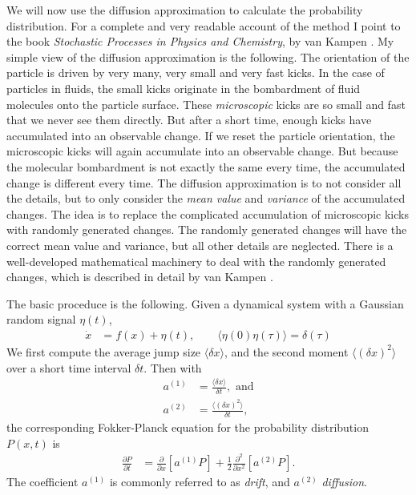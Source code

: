\documentclass[thesis.tex]{subfiles}
\begin{document}
We will now use the diffusion approximation to calculate the probability distribution. For a complete and very readable account of the method I point to the book \emph{Stochastic Processes in Physics and Chemistry}, by van Kampen \cite{kampen2007}. My simple view of the diffusion approximation is the following. The orientation of the particle is driven by very many, very small and very fast kicks. In the case of particles in fluids, the small kicks originate in the bombardment of fluid molecules onto the particle surface. These \emph{microscopic} kicks are so small and fast that we never see them directly. But after a short time, enough kicks have accumulated into an observable change. If we reset the particle orientation, the microscopic kicks will again accumulate into an observable change. But because the molecular bombardment is not exactly the same every time, the accumulated change is different every time. The diffusion approximation is to not consider all the details, but to only consider the \emph{mean value} and \emph{variance} of the accumulated changes. The idea is to replace the complicated accumulation of microscopic kicks with randomly generated changes. The randomly generated changes will have the correct mean value and variance, but all other details are neglected. There is a well-developed mathematical machinery to deal with the randomly generated changes, which is described in detail by van Kampen \cite{kampen2007}.

The basic proceduce is the following. Given a dynamical system with a Gaussian random signal $\eta(t)$,
\begin{align*}
\dot x &= f(x) + \eta(t), \qquad \langle\eta(0)\eta(\tau)\rangle=\delta(\tau)
\end{align*}
We first compute the average jump size $\langle \delta x \rangle$, and the second moment $\langle (\delta x) ^2\rangle$ over a short time interval $\delta t$. Then with
\begin{align*}
	a^{(1)} &= \frac{\langle \delta x\rangle}{\delta t}, \textrm{ and}\\
	a^{(2)} &= \frac{\langle (\delta x)^2\rangle}{\delta t},
\end{align*}
the corresponding Fokker-Planck equation for the probability distribution $P(x,t)$ is 
\begin{align*}
	\frac{\partial P}{\partial t} &= \frac{\partial}{\partial x}\left[a^{(1)} P\right] + \frac{1}{2}\frac{\partial^2}{\partial x^2}\left[a^{(2)} P\right].
\end{align*}
The coefficient $a^{(1)}$ is commonly referred to as \emph{drift}, and $a^{(2)}$ \emph{diffusion}.
\end{document}
